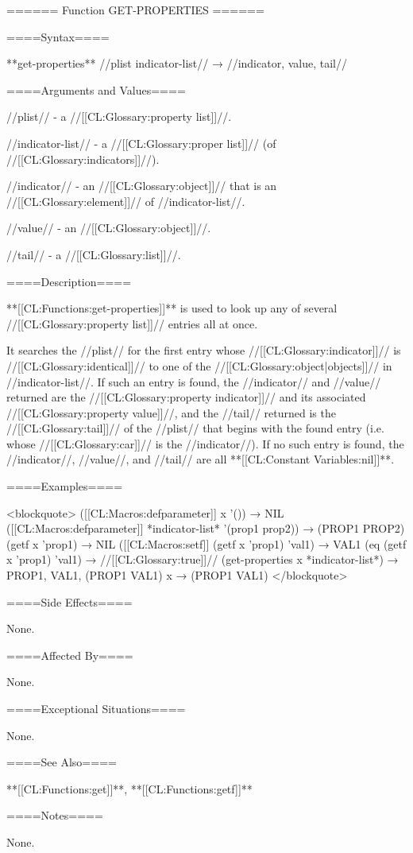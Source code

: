 ====== Function GET-PROPERTIES ======

====Syntax====

**get-properties** //plist indicator-list// → //indicator, value, tail//

====Arguments and Values====

//plist// - a //[[CL:Glossary:property list]]//.

//indicator-list// - a //[[CL:Glossary:proper list]]// (of //[[CL:Glossary:indicators]]//).

//indicator// - an //[[CL:Glossary:object]]// that is an //[[CL:Glossary:element]]// of //indicator-list//.

//value// - an //[[CL:Glossary:object]]//.

//tail// - a //[[CL:Glossary:list]]//.

====Description====

**[[CL:Functions:get-properties]]** is used to look up any of several //[[CL:Glossary:property list]]// entries all at once.

It searches the //plist// for the first entry whose //[[CL:Glossary:indicator]]// is //[[CL:Glossary:identical]]// to one of the //[[CL:Glossary:object|objects]]// in //indicator-list//. If such an entry is found, the //indicator// and //value// returned are the //[[CL:Glossary:property indicator]]// and its associated //[[CL:Glossary:property value]]//, and the //tail// returned is the //[[CL:Glossary:tail]]// of the //plist// that begins with the found entry (i.e. whose //[[CL:Glossary:car]]// is the //indicator//). If no such entry is found, the //indicator//, //value//, and //tail// are all **[[CL:Constant Variables:nil]]**.

====Examples====

<blockquote> ([[CL:Macros:defparameter]] x '()) → NIL ([[CL:Macros:defparameter]] *indicator-list* '(prop1 prop2)) → (PROP1 PROP2) (getf x 'prop1) → NIL ([[CL:Macros:setf]] (getf x 'prop1) 'val1) → VAL1 (eq (getf x 'prop1) 'val1) → //[[CL:Glossary:true]]// (get-properties x *indicator-list*) → PROP1, VAL1, (PROP1 VAL1) x → (PROP1 VAL1) </blockquote>

====Side Effects====

None.

====Affected By====

None.

====Exceptional Situations====

None.

====See Also====

**[[CL:Functions:get]]**, **[[CL:Functions:getf]]**

====Notes====

None.

